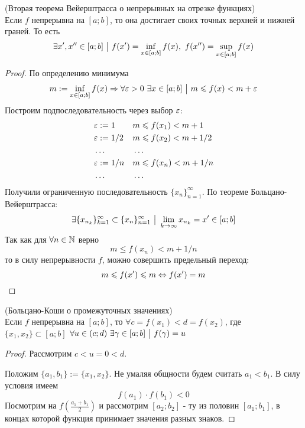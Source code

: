 \begin{theorem} (Вторая теорема Вейерштрасса о непрерывных на отрезке функциях) \\
	Если $f$ непрерывна на $[a; b]$, то она достигает своих точных верхней и нижней граней. То есть
	$$
		\exists x', x'' \in [a; b] \ \big|\  f(x') = \inf\limits_{x \in [a; b]} f(x),\ f(x'') = \sup\limits_{x \in [a; b]} f(x)
	$$
\end{theorem}

\begin{proof}
	По определению минимума
	$$
		m := \inf\limits_{x \in [a; b]} f(x) \Rightarrow \forall \varepsilon > 0\ \exists x \in [a; b] \ \big|\  m \leqslant f(x) < m + \varepsilon
	$$
	Построим подпоследовательность через выбор $\varepsilon$:
	\begin{align*}
		&\varepsilon := 1 & &m \leqslant f(x_1) < m + 1
		\\
		&\varepsilon := 1/2 & &m \leqslant f(x_2) < m + 1/2
		\\
		&\dots & &\dots
		\\
		&\varepsilon := 1/n & &m \leqslant f(x_n) < m + 1/n
		\\
		&\dots & &\dots
	\end{align*}
	Получили ограниченную последовательность $\{x_n\}_{n = 1}^\infty$. По теореме Больцано-Вейерштрасса:
	$$
		\exists \{x_{n_k}\}_{k = 1}^\infty \subset \{x_n\}_{n = 1}^\infty \ \big|\  \lim\limits_{k \to \infty} x_{n_k} = x' \in [a; b] 
	$$
	Так как для $\forall n \in \mathbb{N}$ верно
	$$
		m \le f(x_n) < m + 1/n
	$$
	то в силу непрерывности $f$, можно совершить предельный переход:
	$$
		m \leqslant f(x') \leqslant m \Leftrightarrow f(x') = m
	$$
\end{proof}

\begin{theorem} (Больцано-Коши о промежуточных значениях) \\
	Если $f$ непрерывна на $[a; b]$, то $\forall c = f(x_1) < d = f(x_2)$, где $\{x_1, x_2\} \subset [a; b]$ $\forall u \in (c; d)\ \exists \gamma \in [a; b] \ \big|\  f(\gamma) = u$
\end{theorem}

\begin{proof}
	Рассмотрим $c < u = 0 < d$.
	
	Положим $\{a_1, b_1\} := \{x_1, x_2\}$. Не умаляя общности будем считать $a_1 < b_1$. В силу условия имеем
	$$
		f(a_1) \cdot f(b_1) < 0
	$$
	Посмотрим на $f(\frac{a_1 + b_1}{2})$ и рассмотрим $[a_2; b_2]$ - ту из половин $[a_1; b_1]$, в концах которой функция принимает значения разных знаков.
	
\end{proof}


